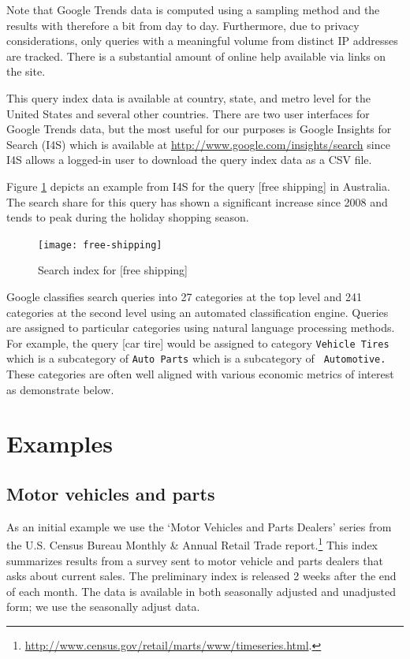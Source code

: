 \documentclass[12pt, oneside]{article}
\begin{document}
Note that Google Trends data is computed using a sampling method and
the results with therefore a bit from day to day.  Furthermore, due to
privacy considerations, only queries with a meaningful volume from
distinct IP addresses are tracked.  There is a substantial amount of
online help available via links on the site.

This query index data is available at country, state, and metro level
for the United States and several other countries. There are two user
interfaces for Google Trends data, but the most useful for our
purposes is Google Insights for Search (I4S) which is available at
\url{http://www.google.com/insights/search} since I4S allows a
logged-in user to download the query index data as a CSV file.

Figure \ref{Fig:free-shipping} depicts an example from I4S for the
query [free shipping] in Australia. The search share for this query
has shown a significant increase since 2008 and tends to peak during
the holiday shopping season.


\begin{figure}[ht]
\begin{center}
\texttt{[image: free-shipping]}
\caption{\label{Fig:free-shipping} Search index for [free shipping]} 
\end{center}
\end{figure}

Google classifies search queries into 27 categories at the top level
and 241 categories at the second level using an automated
classification engine.  Queries are assigned to particular categories
using natural language processing methods. For example, the query [car
tire] would be assigned to category {\tt Vehicle Tires} which is a
subcategory of {\tt Auto Parts} which is a subcategory of {\tt
  Automotive.}  These categories are often well aligned with various
economic metrics of interest as demonstrate below.

\section{Examples}

\subsection{Motor vehicles and parts}
As an initial example we use the `Motor Vehicles and Parts Dealers'
series from the U.S. Census Bureau Monthly \& Annual Retail Trade
report.\footnote{\url{http://www.census.gov/retail/marts/www/timeseries.html}.}
This index summarizes results from a survey sent to motor vehicle and
parts dealers that asks about current sales.  The preliminary index is
released 2 weeks after the end of each month.  The data is available
in both seasonally adjusted and unadjusted form; we use the seasonally
adjust data.
\end{document}
